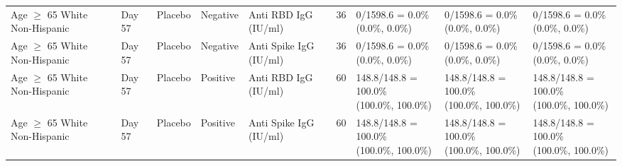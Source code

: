 \documentclass[]{book}
\theoremstyle{definition}
\theoremstyle{definition}
\theoremstyle{definition}
\newcommand{\1}{\mathbbm{1}}
\begin{document}
\begin{landscape}
\begin{ThreePartTable}
\begin{longtable}[t]{>{\raggedright\arraybackslash}p{2.7cm}llllllll}
\hspace{1em}Age $\geq$ 65 White Non-Hispanic & Day 57 & Placebo & Negative & Anti RBD IgG (IU/ml) & 36 & \makecell[l]{0/1598.6 = 0.0\%\\(0.0\%, 0.0\%)} & \makecell[l]{0/1598.6 = 0.0\%\\(0.0\%, 0.0\%)} & \makecell[l]{0/1598.6 = 0.0\%\\(0.0\%, 0.0\%)}\\
\hspace{1em}Age $\geq$ 65 White Non-Hispanic & Day 57 & Placebo & Negative & Anti Spike IgG (IU/ml) & 36 & \makecell[l]{0/1598.6 = 0.0\%\\(0.0\%, 0.0\%)} & \makecell[l]{0/1598.6 = 0.0\%\\(0.0\%, 0.0\%)} & \makecell[l]{0/1598.6 = 0.0\%\\(0.0\%, 0.0\%)}\\
\hspace{1em}Age $\geq$ 65 White Non-Hispanic & Day 57 & Placebo & Positive & Anti RBD IgG (IU/ml) & 60 & \makecell[l]{148.8/148.8 = 100.0\%\\(100.0\%, 100.0\%)} & \makecell[l]{148.8/148.8 = 100.0\%\\(100.0\%, 100.0\%)} & \makecell[l]{148.8/148.8 = 100.0\%\\(100.0\%, 100.0\%)}\\
\hspace{1em}Age $\geq$ 65 White Non-Hispanic & Day 57 & Placebo & Positive & Anti Spike IgG (IU/ml) & 60 & \makecell[l]{148.8/148.8 = 100.0\%\\(100.0\%, 100.0\%)} & \makecell[l]{148.8/148.8 = 100.0\%\\(100.0\%, 100.0\%)} & \makecell[l]{148.8/148.8 = 100.0\%\\(100.0\%, 100.0\%)}\\*
\end{longtable}
\end{ThreePartTable}


\clearpage


\end{landscape}
\end{document}
